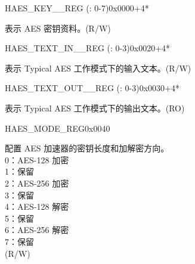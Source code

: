 \begin{register}{H}{AES\_KEY\_\_REG (: 0-7)}{0x0000+4*}\label{regdesc:AESKEYnREG}
%
\regnewline%
\begin{regdesc}\begin{reglist}
\item [AES\_KEY\_\regindex{n}\_REG (\regindex{n}: 0-7)] 表示 AES 密钥资料。(R/W)
\end{reglist}\end{regdesc}
\end{register}

\begin{register}{H}{AES\_TEXT\_IN\_\_REG (: 0-3)}{0x0020+4*}\label{regdesc:AESTEXTINnREG}
%
\regnewline%
\begin{regdesc}\begin{reglist}
\item [AES\_TEXT\_IN\_\regindex{m}\_REG (\regindex{m}: 0-3)] 表示 Typical AES 工作模式下的输入文本。(R/W)
\end{reglist}\end{regdesc}
\end{register}


\begin{register}{H}{AES\_TEXT\_OUT\_\_REG (: 0-3)}{0x0030+4*}\label{regdesc:AESTEXTOUTnREG}
%
\regnewline%
\begin{regdesc}\begin{reglist}
\item [AES\_TEXT\_OUT\_\regindex{m}\_REG (\regindex{m}: 0-3)] 表示 Typical AES 工作模式下的输出文本。(RO)
\end{reglist}\end{regdesc}
\end{register}


\begin{register}{H}{AES\_MODE\_REG}{0x0040}\label{regdesc:AESMODEREG}
%
%
\regnewline%
\begin{regdesc}\begin{reglist}
\item [AES\_MODE] 配置 AES 加速器的密钥长度和加解密方向。\\
0：AES-128 加密\\
1：保留\\
2：AES-256 加密\\
3：保留\\
4：AES-128 解密\\
5：保留\\
6：AES-256 解密\\
7：保留\\
(R/W)
\end{reglist}\end{regdesc}
\end{register}


